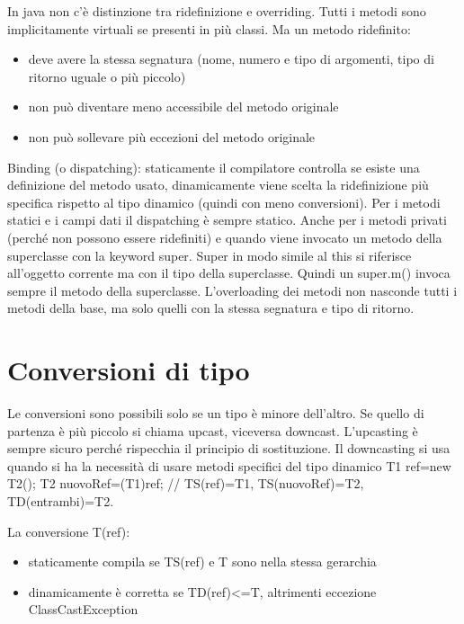 In java non c'è distinzione tra ridefinizione e overriding. Tutti i metodi sono implicitamente virtuali se presenti in più classi. Ma un metodo ridefinito:
\begin{itemize}
\item deve avere la stessa segnatura (nome, numero e tipo di argomenti, tipo di ritorno uguale o più piccolo)
\item non può diventare meno accessibile del metodo originale
\item non può sollevare più eccezioni del metodo originale
\end{itemize}
Binding (o dispatching): staticamente il compilatore controlla se esiste una definizione del metodo usato, dinamicamente viene scelta la ridefinizione più specifica rispetto al tipo dinamico (quindi con meno conversioni).
Per i metodi statici e i campi dati il dispatching è sempre statico. Anche per i metodi privati (perché non possono essere ridefiniti) e quando viene invocato un metodo della superclasse con la keyword super. Super in modo simile al this si riferisce all'oggetto corrente ma con il tipo della superclasse. Quindi un super.m() invoca sempre il metodo della superclasse.
L'overloading dei metodi non nasconde tutti i metodi della base, ma solo quelli con la stessa segnatura e tipo di ritorno.

\section{Conversioni di tipo}
Le conversioni sono possibili solo se un tipo è minore dell'altro. Se quello di partenza è più piccolo si chiama upcast, viceversa downcast.
L'upcasting è sempre sicuro perché rispecchia il principio di sostituzione.
Il downcasting si usa quando si ha la necessità di usare metodi specifici del tipo dinamico %
T1 ref=new T2();
T2 nuovoRef=(T1)ref;
// TS(ref)=T1, TS(nuovoRef)=T2, TD(entrambi)=T2.

La conversione T(ref):
\begin{itemize}
\item  staticamente compila se TS(ref) e T sono nella stessa gerarchia
\item  dinamicamente è corretta se TD(ref)<=T, altrimenti eccezione ClassCastException
\end{itemize}

